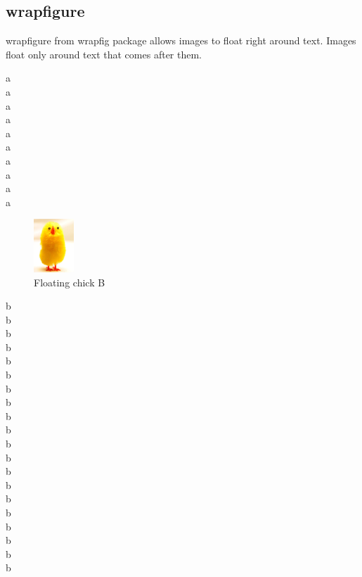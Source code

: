 \documentclass[12pt]{article}
\begin{document}
%

  \subsection{wrapfigure}\label{wrapfigure}%

    wrapfigure from wrapfig package allows images to float right around text.
    Images float only around text that comes after them.

    a \\ a \\ a \\ a\\ a \\ a \\ a \\ a \\ a\\ a \\

    \begin{figure}
      \includegraphics[height=2cm]{image.png}
      \caption{Floating chick B}
    \end{figure}

    b \\ b \\ b \\ b\\ b \\ b \\ b \\ b \\ b\\ b \\
    b \\ b \\ b \\ b\\ b \\ b \\ b \\ b \\ b\\ b \\
\end{document}
